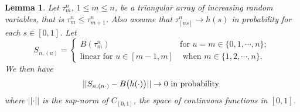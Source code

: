 \documentclass[11pt]{amsart}
\newtheorem{lemma}[theorem]{\sc Lemma}
\begin{document}
\bigskip

\begin{lemma}
\label{lemmaMCLT}
 Let $\tau_{m}^{n}$, $1 \leq m \leq n$, be a triangular array of increasing random variables, that is $\tau_{m}^n \leq \tau_{m+1}^n$. Also assume that $\tau_{[ns]}^{n} \to h(s)$  in probability for each $s \in [0,1]$. Let 
\[S_{n,(u)}= \left \{ \begin{array}{ll}B(\tau_{m}^{n}) & \mbox{for $u=m \in \{0,1,\cdots,n\}$};\\
                 \mbox{linear for $u \in [m-1,m]$}& \mbox{ when $m \in \{ 1,2,\cdots,n\}$}. \end{array} \right.\]
We then have     
\[ \vert \vert S_{n,(n\cdot)} - B\big{(}h(\cdot)\big{)} \vert \vert \to 0  \mbox{ in probability } \]
where $\vert \vert \cdot \vert \vert$ is the sup-norm of $C_{[0,1]}$, the space of  continuous functions in $[0,1]$. 
\end{lemma}
\end{document}
